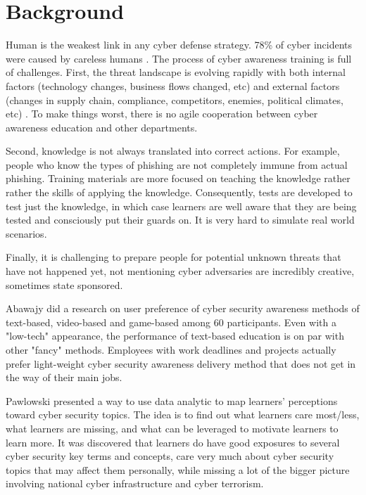 \documentclass[conference]{IEEEtran}
\begin{document}
\section{Background}
Human is the weakest link in any cyber defense strategy. 78\% of cyber incidents were caused by careless humans \cite{20172017Overview}. The process of cyber awareness training is full of challenges. First, the threat landscape is evolving rapidly with both internal factors (technology changes, business flows changed, etc) and external factors (changes in supply chain, compliance, competitors, enemies, political climates, etc) \cite{Ingalsbe2008ThreatEnd, Manadhata2011AnMetric}. To make things worst, there is no agile cooperation between cyber awareness education and other departments. 

Second, knowledge is not always translated into correct actions. For example, people who know the types of phishing are not completely immune from actual phishing. Training materials are more focused on teaching the knowledge rather rather the skills of applying the knowledge. Consequently, tests are developed to test just the knowledge, in which case learners are well aware that they are being tested and consciously put their guards on. It is very hard to simulate real world scenarios.

Finally, it is challenging to prepare people for potential unknown threats that have not happened yet, not mentioning cyber adversaries are incredibly creative, sometimes state sponsored.

Abawajy \cite{Abawajy2014UserMethods} did a research on user preference of cyber security awareness methods of text-based, video-based and game-based among 60 participants. Even with a "low-tech" appearance, the performance of text-based education is on par with other "fancy" methods. Employees with work deadlines and projects actually prefer light-weight cyber security awareness delivery method that does not get in the way of their main jobs.

Pawlowski \cite{Pawlowski2016SocialDesign} presented a way to use data analytic to map learners' perceptions toward cyber security topics. The idea is to find out what learners care most/less, what learners are missing, and what can be leveraged to motivate learners to learn more. It was discovered that learners do have good exposures to several cyber security key terms and concepts, care very much about cyber security topics that may affect them personally, while missing a lot of the bigger picture involving national cyber infrastructure and cyber terrorism.
\end{document}
